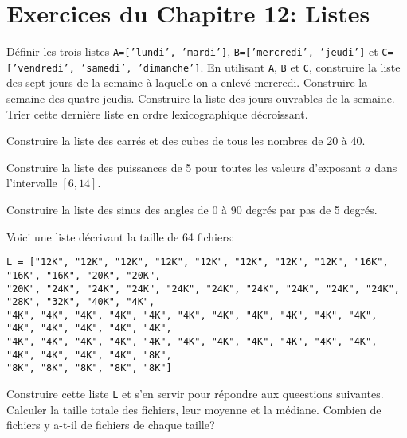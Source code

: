 

\section*{Exercices du Chapitre 12: Listes}

\begin{exercice}
Définir les trois listes
\texttt{A=['lundi', 'mardi']},
\texttt{B=['mercredi', 'jeudi']} et
\texttt{C=['vendredi', 'samedi', 'dimanche']}.
En utilisant \texttt{A}, \texttt{B} et \texttt{C},
construire la liste des sept jours de la semaine à laquelle on a enlevé mercredi.
Construire la semaine des quatre jeudis.
Construire la liste des jours ouvrables de la semaine. 
Trier cette dernière liste en ordre lexicographique décroissant.
\end{exercice}

\begin{exercice}
Construire la liste des carrés et des cubes de tous les nombres de 20 à 40.
\end{exercice}

\begin{exercice}
Construire la liste des puissances de 5 pour toutes les valeurs d'exposant $a$
dans l'intervalle $[6,14]$.
\end{exercice}

\begin{exercice}
Construire la liste des sinus des angles de 0 à 90 degrés par pas de 5 degrés.
\end{exercice}

\begin{exercice}
Voici une liste décrivant la taille de 64 fichiers:
{\footnotesize
\begin{verbatim}
L = ["12K", "12K", "12K", "12K", "12K", "12K", "12K", "12K", "16K", "16K", "16K", "20K", "20K", 
"20K", "24K", "24K", "24K", "24K", "24K", "24K", "24K", "24K", "24K", "28K", "32K", "40K", "4K", 
"4K", "4K", "4K", "4K", "4K", "4K", "4K", "4K", "4K", "4K", "4K", "4K", "4K", "4K", "4K", "4K", 
"4K", "4K", "4K", "4K", "4K", "4K", "4K", "4K", "4K", "4K", "4K", "4K", "4K", "4K", "4K", "8K", 
"8K", "8K", "8K", "8K", "8K"] 
\end{verbatim}
}
Construire cette liste \texttt{L} et s'en servir pour répondre aux queestions
suivantes. Calculer la taille totale des fichiers,
leur moyenne et la médiane.
Combien de fichiers y a-t-il de fichiers de chaque taille?
\end{exercice}


